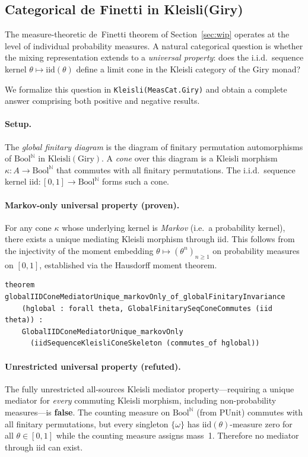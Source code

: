 \documentclass[]{article}
\begin{document}
\subsection{Categorical de Finetti in Kleisli(Giry)}
\label{sec:categorical-definetti}

The measure-theoretic de~Finetti theorem of Section~\ref{sec:wip} operates at
the level of individual probability measures.  A natural categorical question is
whether the mixing representation extends to a \emph{universal property}: does
the i.i.d.\ sequence kernel $\theta \mapsto \text{iid}(\theta)$ define a limit
cone in the Kleisli category of the Giry monad?

We formalize this question in \texttt{Kleisli(MeasCat.Giry)} and obtain a
complete answer comprising both positive and negative results.

\paragraph{Setup.}
The \emph{global finitary diagram} is the diagram of finitary permutation
automorphisms of $\text{Bool}^{\mathbb{N}}$ in $\text{Kleisli}(\text{Giry})$.
A \emph{cone} over this diagram is a Kleisli morphism $\kappa : A \to
\text{Bool}^{\mathbb{N}}$ that commutes with all finitary permutations.  The
i.i.d.\ sequence kernel $\text{iid} : [0,1] \to \text{Bool}^{\mathbb{N}}$
forms such a cone.

\paragraph{Markov-only universal property (proven).}
For any cone $\kappa$ whose underlying kernel is \emph{Markov} (i.e.\ a
probability kernel), there exists a unique mediating Kleisli morphism through
$\text{iid}$.  This follows from the injectivity of the moment embedding
$\theta \mapsto (\theta^n)_{n \geq 1}$ on probability measures on $[0,1]$,
established via the Hausdorff moment theorem.

\begin{lstlisting}[basicstyle=\scriptsize\ttfamily,frame=single,numbers=none]
theorem globalIIDConeMediatorUnique_markovOnly_of_globalFinitaryInvariance
    (hglobal : forall theta, GlobalFinitarySeqConeCommutes (iid theta)) :
    GlobalIIDConeMediatorUnique_markovOnly
      (iidSequenceKleisliConeSkeleton (commutes_of hglobal))
\end{lstlisting}

\paragraph{Unrestricted universal property (refuted).}
The fully unrestricted all-sources Kleisli mediator property---requiring a
unique mediator for \emph{every} commuting Kleisli morphism, including
non-probability measures---is \textbf{false}.  The counting measure on
$\text{Bool}^{\mathbb{N}}$ (from $\text{PUnit}$) commutes with all finitary
permutations, but every singleton $\{\omega\}$ has $\text{iid}(\theta)$-measure
zero for all $\theta \in [0,1]$ while the counting measure assigns mass~1.
Therefore no mediator through $\text{iid}$ can exist.
\end{document}
